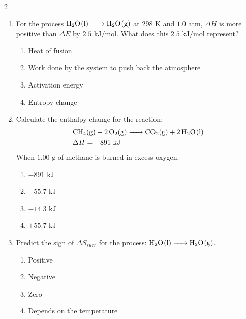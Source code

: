 \documentclass[12pt,letterpaper]{article}
\begin{document}
\begin{multicols*}{2}
\begin{enumerate}
        \item For the process $\ce{H2O(l) -> H2O(g)}$ at $298\text{ K}$ and $1.0\text{ atm}$, $\Delta H$ is more positive than $\Delta E$ by $2.5\text{ kJ/mol}$. What does this $2.5\text{ kJ/mol}$ represent? %
            \begin{enumerate}
                \item Heat of fusion
                \item Work done by the system to push back the atmosphere
                \item Activation energy
                \item Entropy change
            \end{enumerate}
        \item Calculate the enthalpy change for the reaction:
            \begin{align*}
                &\ce{CH4(g) + 2O2(g) -> CO2(g) + 2H2O(l)}\\ 
                &\Delta H = -891\text{ kJ}
            \end{align*}
            When $1.00\text{ g}$ of methane is burned in excess oxygen. %
            \begin{enumerate}
                \item $-891\text{ kJ}$
                \item $-55.7\text{ kJ}$
                \item $-14.3\text{ kJ}$
                \item $+55.7\text{ kJ}$
            \end{enumerate}
        \columnbreak
        \item Predict the sign of $\Delta S_{surr}$ for the process: $\ce{H2O(l) -> H2O(g)}$. %
            \begin{enumerate}
                \item Positive
                \item Negative
                \item Zero
                \item Depends on the temperature
            \end{enumerate}


\end{enumerate}
\end{multicols*}
\end{document}
